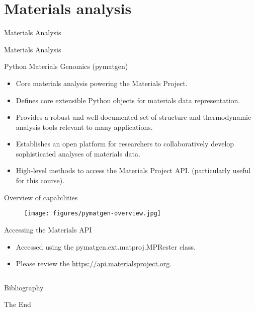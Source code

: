 \documentclass[aspectratio=169]{beamer}
\begin{document}
    \section{Materials analysis}

    \begin{frame}{Materials Analysis}
        \Huge{\centerline{Materials Analysis}}
    \end{frame}

    \begin{frame}{Python Materials Genomics (pymatgen)}
        \begin{itemize}
            \item Core materials analysis powering the Materials Project.\cite{ongPythonMaterialsGenomics2013}
            \item Defines core extensible Python objects for materials data representation.
            \item Provides a robust and well-documented set of structure and thermodynamic analysis tools relevant to many applications.
            \item Establishes an open platform for researchers to collaboratively develop sophisticated analyses of materials data.
            \item High-level methods to access the Materials Project API.\cite{ongMaterialsApplicationProgramming2015} (particularly useful for this course).
        \end{itemize}
    \end{frame}


    \begin{frame}{Overview of capabilities}
        \begin{figure}
            \centering
            \texttt{[image: figures/pymatgen-overview.jpg]}
        \end{figure}
    \end{frame}


    \begin{frame}[fragile]{Accessing the Materials API}
        \begin{itemize}
            \item Accessed using the pymatgen.ext.matproj.MPRester class.
            \item Please review the \href{Materials API documentation}{https://api.materialsproject.org}.
            \inputminted{python}{example_materials_api.py}
        \end{itemize}
    \end{frame}


    \begin{frame}[allowframebreaks]{Bibliography}
        
        
    \end{frame}


    \begin{frame}
        \Huge{\centerline{The End}}
    \end{frame}
\end{document}
